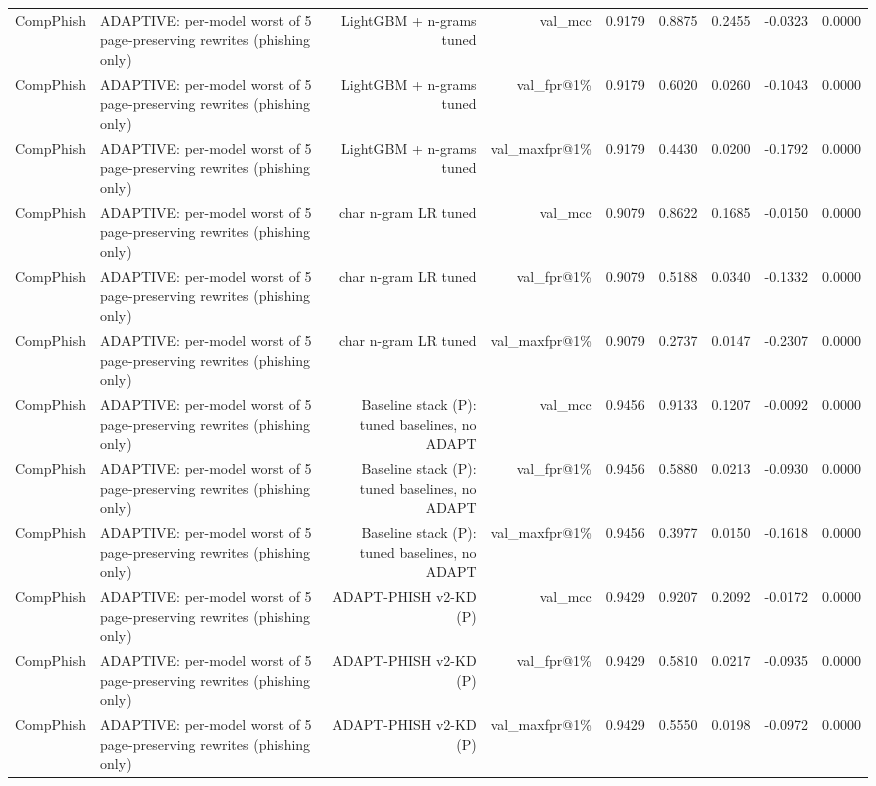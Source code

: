 \begin{table}[t]
\begin{tabular}{llrrrrrrr}
CompPhish & ADAPTIVE: per-model worst of 5 page-preserving rewrites (phishing only) & LightGBM + n-grams tuned & val\_mcc & 0.9179 & 0.8875 & 0.2455 & -0.0323 & 0.0000 \\
CompPhish & ADAPTIVE: per-model worst of 5 page-preserving rewrites (phishing only) & LightGBM + n-grams tuned & val\_fpr@1\% & 0.9179 & 0.6020 & 0.0260 & -0.1043 & 0.0000 \\
CompPhish & ADAPTIVE: per-model worst of 5 page-preserving rewrites (phishing only) & LightGBM + n-grams tuned & val\_maxfpr@1\% & 0.9179 & 0.4430 & 0.0200 & -0.1792 & 0.0000 \\
CompPhish & ADAPTIVE: per-model worst of 5 page-preserving rewrites (phishing only) & char n-gram LR tuned & val\_mcc & 0.9079 & 0.8622 & 0.1685 & -0.0150 & 0.0000 \\
CompPhish & ADAPTIVE: per-model worst of 5 page-preserving rewrites (phishing only) & char n-gram LR tuned & val\_fpr@1\% & 0.9079 & 0.5188 & 0.0340 & -0.1332 & 0.0000 \\
CompPhish & ADAPTIVE: per-model worst of 5 page-preserving rewrites (phishing only) & char n-gram LR tuned & val\_maxfpr@1\% & 0.9079 & 0.2737 & 0.0147 & -0.2307 & 0.0000 \\
CompPhish & ADAPTIVE: per-model worst of 5 page-preserving rewrites (phishing only) & Baseline stack (P): tuned baselines, no ADAPT & val\_mcc & 0.9456 & 0.9133 & 0.1207 & -0.0092 & 0.0000 \\
CompPhish & ADAPTIVE: per-model worst of 5 page-preserving rewrites (phishing only) & Baseline stack (P): tuned baselines, no ADAPT & val\_fpr@1\% & 0.9456 & 0.5880 & 0.0213 & -0.0930 & 0.0000 \\
CompPhish & ADAPTIVE: per-model worst of 5 page-preserving rewrites (phishing only) & Baseline stack (P): tuned baselines, no ADAPT & val\_maxfpr@1\% & 0.9456 & 0.3977 & 0.0150 & -0.1618 & 0.0000 \\
CompPhish & ADAPTIVE: per-model worst of 5 page-preserving rewrites (phishing only) & ADAPT-PHISH v2-KD (P) & val\_mcc & 0.9429 & 0.9207 & 0.2092 & -0.0172 & 0.0000 \\
CompPhish & ADAPTIVE: per-model worst of 5 page-preserving rewrites (phishing only) & ADAPT-PHISH v2-KD (P) & val\_fpr@1\% & 0.9429 & 0.5810 & 0.0217 & -0.0935 & 0.0000 \\
CompPhish & ADAPTIVE: per-model worst of 5 page-preserving rewrites (phishing only) & ADAPT-PHISH v2-KD (P) & val\_maxfpr@1\% & 0.9429 & 0.5550 & 0.0198 & -0.0972 & 0.0000 \\

\end{tabular}
\end{table}
